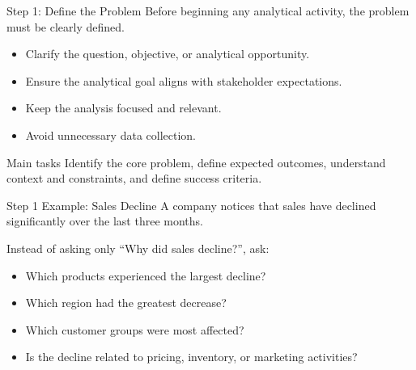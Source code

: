 \documentclass[aspectratio=169,11pt]{beamer}
\begin{document}
\begin{frame}{Step 1: Define the Problem}
Before beginning any analytical activity, the problem must be clearly defined.
\begin{itemize}
  \item Clarify the question, objective, or analytical opportunity.
  \item Ensure the analytical goal aligns with stakeholder expectations.
  \item Keep the analysis focused and relevant.
  \item Avoid unnecessary data collection.
\end{itemize}
\begin{block}{Main tasks}
Identify the core problem, define expected outcomes, understand context and constraints, and define success criteria.
\end{block}
\end{frame}

\begin{frame}{Step 1 Example: Sales Decline}
A company notices that sales have declined significantly over the last three months.
\begin{block}{Instead of asking only ``Why did sales decline?'', ask:}
\begin{itemize}
  \item Which products experienced the largest decline?
  \item Which region had the greatest decrease?
  \item Which customer groups were most affected?
  \item Is the decline related to pricing, inventory, or marketing activities?
\end{itemize}
\end{block}
\end{frame}
\end{document}
